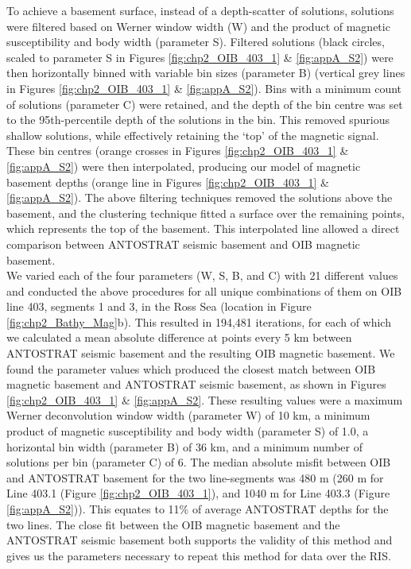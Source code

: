 To achieve a basement surface, instead of a depth-scatter of solutions, solutions were filtered based on Werner window width (W) and the product of magnetic susceptibility and body width (parameter S). Filtered solutions (black circles, scaled to parameter S in Figures \ref{fig:chp2_OIB_403_1} \& \ref{fig:appA_S2}) were then horizontally binned with variable bin sizes (parameter B) (vertical grey lines in Figures \ref{fig:chp2_OIB_403_1} \& \ref{fig:appA_S2}). Bins with a minimum count of solutions (parameter C) were retained, and the depth of the bin centre was set to the 95th-percentile depth of the solutions in the bin. This removed spurious shallow solutions, while effectively retaining the ‘top’ of the magnetic signal. These bin centres (orange crosses in Figures \ref{fig:chp2_OIB_403_1} \& \ref{fig:appA_S2}) were then interpolated, producing our model of magnetic basement depths (orange line in Figures \ref{fig:chp2_OIB_403_1} \& \ref{fig:appA_S2}). The above filtering techniques removed the solutions above the basement, and the clustering technique fitted a surface over the remaining points, which represents the top of the basement. This interpolated line allowed a direct comparison between ANTOSTRAT seismic basement and OIB magnetic basement.\\

We varied each of the four parameters (W, S, B, and C) with 21 different values and conducted the above procedures for all unique combinations of them on OIB line 403, segments 1 and 3, in the Ross Sea (location in Figure \ref{fig:chp2_Bathy_Mag}b). This resulted in 194,481 iterations, for each of which we calculated a mean absolute difference at points every 5 km between ANTOSTRAT seismic basement and the resulting OIB magnetic basement. We found the parameter values which produced the closest match between OIB magnetic basement and ANTOSTRAT seismic basement, as shown in Figures \ref{fig:chp2_OIB_403_1} \& \ref{fig:appA_S2}. These resulting values were a maximum Werner deconvolution window width (parameter W) of 10 km, a minimum product of magnetic susceptibility and body width (parameter S) of 1.0, a horizontal bin width (parameter B) of 36 km, and a minimum number of solutions per bin (parameter C) of 6. The median absolute misfit between OIB and ANTOSTRAT basement for the two line-segments was 480 m (260 m for Line 403.1 (Figure \ref{fig:chp2_OIB_403_1}), and 1040 m for Line 403.3 (Figure \ref{fig:appA_S2})). This equates to 11\% of average ANTOSTRAT depths for the two lines. The close fit between the OIB magnetic basement and the ANTOSTRAT seismic basement both supports the validity of this method and gives us the parameters necessary to repeat this method for data over the RIS.

